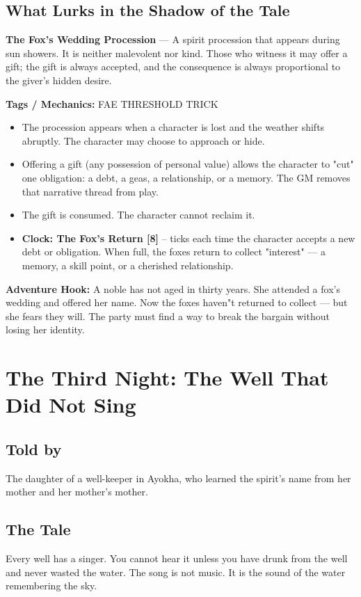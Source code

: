 \documentclass[10pt,twoside]{book}
\newcommand{\tag}[1]{\textsc{#1}}
\begin{document}
\section*{What Lurks in the Shadow of the Tale}
\begin{infobox}
\textbf{The Fox's Wedding Procession} --- A spirit procession that appears during sun showers. It is neither malevolent nor kind. Those who witness it may offer a gift; the gift is always accepted, and the consequence is always proportional to the giver's hidden desire.

\textbf{Tags / Mechanics:} \tag{FAE} \tag{THRESHOLD} \tag{TRICK}

\begin{itemize}
\item The procession appears when a character is lost and the weather shifts abruptly. The character may choose to approach or hide.
\item Offering a gift (any possession of personal value) allows the character to "cut" one obligation: a debt, a geas, a relationship, or a memory. The GM removes that narrative thread from play.
\item The gift is consumed. The character cannot reclaim it.
\item \textbf{Clock: The Fox's Return [8]} -- ticks each time the character accepts a new debt or obligation. When full, the foxes return to collect "interest" --- a memory, a skill point, or a cherished relationship.
\end{itemize}

\textbf{Adventure Hook:} A noble has not aged in thirty years. She attended a fox's wedding and offered her name. Now the foxes haven"t returned to collect --- but she fears they will. The party must find a way to break the bargain without losing her identity.
\end{infobox}

\chapter{The Third Night: The Well That Did Not Sing}

\section*{Told by}
The daughter of a well-keeper in Ayokha, who learned the spirit's name from her mother and her mother's mother.

\section*{The Tale}
Every well has a singer. You cannot hear it unless you have drunk from the well and never wasted the water. The song is not music. It is the sound of the water remembering the sky.
\end{document}
